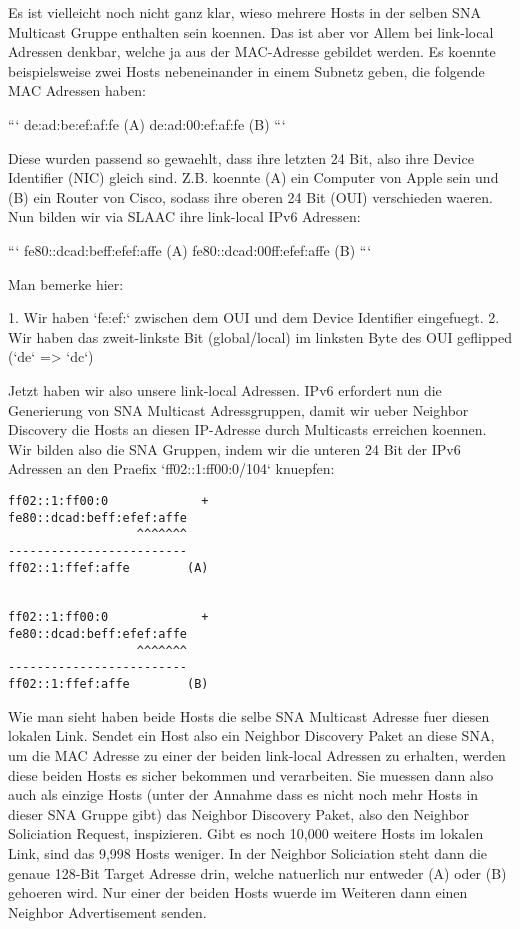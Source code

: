 Es ist vielleicht noch nicht ganz klar, wieso mehrere Hosts in der selben SNA
Multicast Gruppe enthalten sein koennen. Das ist aber vor Allem bei link-local
Adressen denkbar, welche ja aus der MAC-Adresse gebildet werden. Es koennte
beispielsweise zwei Hosts nebeneinander in einem Subnetz geben, die folgende MAC
Adressen haben:

```
de:ad:be:ef:af:fe (A)
de:ad:00:ef:af:fe (B)
```

Diese wurden passend so gewaehlt, dass ihre letzten 24 Bit, also ihre Device
Identifier (NIC) gleich sind. Z.B. koennte (A) ein Computer von Apple sein und
(B) ein Router von Cisco, sodass ihre oberen 24 Bit (OUI) verschieden
waeren. Nun bilden wir via SLAAC ihre link-local IPv6 Adressen:

```
fe80::dcad:beff:efef:affe (A)
fe80::dcad:00ff:efef:affe (B)
```

Man bemerke hier:

1. Wir haben `fe:ef:` zwischen dem OUI und dem Device Identifier eingefuegt.
2. Wir haben das zweit-linkste Bit (global/local) im linksten Byte des OUI
   geflipped (`de` => `dc`)

Jetzt haben wir also unsere link-local Adressen. IPv6 erfordert nun die
Generierung von SNA Multicast Adressgruppen, damit wir ueber Neighbor Discovery
die Hosts an diesen IP-Adresse durch Multicasts erreichen koennen. Wir bilden
also die SNA Gruppen, indem wir die unteren 24 Bit der IPv6 Adressen an den
Praefix `ff02::1:ff00:0/104` knuepfen:

\begin{verbatim}
ff02::1:ff00:0             +
fe80::dcad:beff:efef:affe
                  ^^^^^^^
-------------------------
ff02::1:ffef:affe        (A)


ff02::1:ff00:0             +
fe80::dcad:beff:efef:affe
                  ^^^^^^^
-------------------------
ff02::1:ffef:affe        (B)
\end{verbatim}

Wie man sieht haben beide Hosts die selbe SNA Multicast Adresse fuer diesen
lokalen Link. Sendet ein Host also ein Neighbor Discovery Paket an diese SNA, um
die MAC Adresse zu einer der beiden link-local Adressen zu erhalten, werden
diese beiden Hosts es sicher bekommen und verarbeiten. Sie muessen dann also
auch als einzige Hosts (unter der Annahme dass es nicht noch mehr Hosts in
dieser SNA Gruppe gibt) das Neighbor Discovery Paket, also den Neighbor
Soliciation Request, inspizieren. Gibt es noch 10,000 weitere Hosts im lokalen
Link, sind das 9,998 Hosts weniger. In der Neighbor Soliciation steht dann die
genaue 128-Bit Target Adresse drin, welche natuerlich nur entweder (A) oder (B)
gehoeren wird. Nur einer der beiden Hosts wuerde im Weiteren dann einen Neighbor
Advertisement senden.


